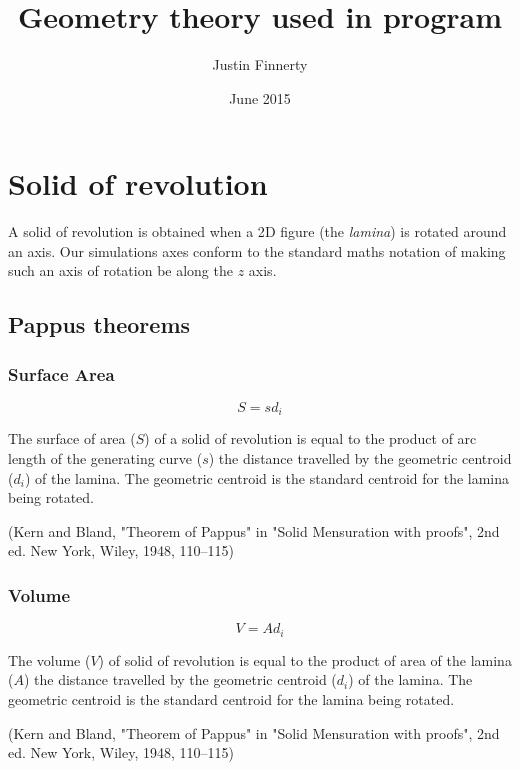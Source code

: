 \documentclass[a4paper,10pt]{article}
\title{Geometry theory used in program}
\author{Justin Finnerty}
\date{June 2015}
\begin{document}
\maketitle{}

\section{Solid of revolution}

A solid of revolution is obtained when a 2{D} figure
(the \textit{lamina}) is rotated around an axis. Our
simulations axes conform to the standard maths notation
of making such an axis of rotation be along the $z$ axis.

\subsection{Pappus theorems}
\subsubsection{Surface Area}

\begin{equation}
S = sd_i \label{eqn:pappus:surface}
\end{equation}

The surface of area ($S$) of a solid of revolution is equal to
the product of arc length of the generating curve ($s$) the 
distance travelled by the geometric centroid ($d_i$) of 
the lamina.  The geometric centroid is the standard centroid 
for the lamina being rotated.

(Kern and Bland, "Theorem of Pappus" in "Solid Mensuration with
proofs", 2nd ed. New York, Wiley, 1948, 110--115)

\subsubsection{Volume}

\begin{equation}
V = Ad_i \label{eqn:pappus:volume}
\end{equation}

The volume ($V$) of solid of revolution is equal to
the product of area of the lamina ($A$) the 
distance travelled by the geometric centroid ($d_i$) of 
the lamina.  The geometric centroid is the standard 
centroid for the lamina being rotated.

(Kern and Bland, "Theorem of Pappus" in "Solid Mensuration with
proofs", 2nd ed. New York, Wiley, 1948, 110--115)
\end{document}
